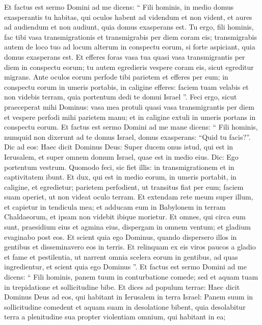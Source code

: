 \begin{biblechapter}
\begin{biblechapter}
\begin{biblechapter}
\begin{biblechapter}
\begin{biblechapter}
\begin{biblechapter}
\begin{biblechapter}
\begin{biblechapter}
\begin{biblechapter}
\begin{biblechapter}
\begin{biblechapter}
\begin{biblechapter}
\verse Et factus est sermo Domini ad me dicens: 
\verse “ Fili hominis, in medio domus exasperantis tu habitas, qui oculos habent ad videndum et non vident, et aures ad audiendum et non audiunt, quia domus exasperans est. 
\verse Tu ergo, fili hominis, fac tibi vasa transmigrationis et transmigrabis per diem coram eis; transmigrabis autem de loco tuo ad locum alterum in conspectu eorum, si forte aspiciant, quia domus exasperans est. 
\verse Et efferes foras vasa tua quasi vasa transmigrantis per diem in conspectu eorum; tu autem egredieris vespere coram eis, sicut egreditur migrans. 
\verse Ante oculos eorum perfode tibi parietem et efferes per eum; 
\verse in conspectu eorum in umeris portabis, in caligine efferes: faciem tuam velabis et non videbis terram, quia portentum dedi te domui Israel ”.
 \verse Feci ergo, sicut praeceperat mihi Dominus: vasa mea protuli quasi vasa transmigrantis per diem et vespere perfodi mihi parietem manu; et in caligine extuli in umeris portans in conspectu eorum.
 \verse Et factus est sermo Domini ad me mane dicens: 
\verse “ Fili hominis, numquid non dixerunt ad te domus Israel, domus exasperans: “Quid tu facis?”. 
\verse Dic ad eos: Haec dicit Dominus Deus: Super ducem onus istud, qui est in Ierusalem, et super omnem domum Israel, quae est in medio eius. 
\verse Dic: Ego portentum vestrum. Quomodo feci, sic fiet illis: in transmigrationem et in captivitatem ibunt. 
\verse Et dux, qui est in medio eorum, in umeris portabit, in caligine, et egredietur; parietem perfodient, ut transitus fiat per eum; faciem suam operiet, ut non videat oculo terram. 
\verse Et extendam rete meum super illum, et capietur in tendicula mea; et adducam eum in Babylonem in terram Chaldaeorum, et ipsam non videbit ibique morietur. 
\verse Et omnes, qui circa eum sunt, praesidium eius et agmina eius, dispergam in omnem ventum; et gladium evaginabo post eos. 
\verse Et scient quia ego Dominus, quando dispersero illos in gentibus et disseminavero eos in terris. 
\verse Et relinquam ex eis viros paucos a gladio et fame et pestilentia, ut narrent omnia scelera eorum in gentibus, ad quas ingredientur, et scient quia ego Dominus ”.
 \verse Et factus est sermo Domini ad me dicens: 
\verse “ Fili hominis, panem tuum in conturbatione comede; sed et aquam tuam in trepidatione et sollicitudine bibe. 
\verse Et dices ad populum terrae: Haec dicit Dominus Deus ad eos, qui habitant in Ierusalem in terra Israel: Panem suum in sollicitudine comedent et aquam suam in desolatione bibent, quia desolabitur terra a plenitudine sua propter violentiam omnium, qui habitant in ea; 

\end{biblechapter}
\end{biblechapter}
\end{biblechapter}
\end{biblechapter}
\end{biblechapter}
\end{biblechapter}
\end{biblechapter}
\end{biblechapter}
\end{biblechapter}
\end{biblechapter}
\end{biblechapter}
\end{biblechapter}
